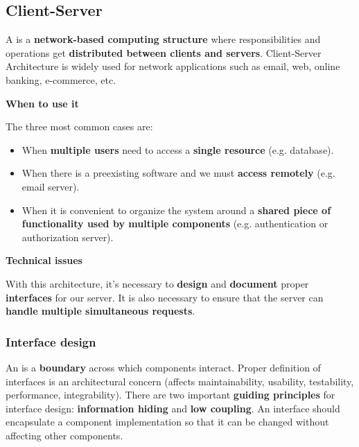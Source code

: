 \subsection{Client-Server}

A  is a \textbf{network-based computing structure} where responsibilities and operations get \textbf{distributed between clients and servers}. Client-Server Architecture is widely used for network applications such as email, web, online banking, e-commerce, etc.

\begin{flushleft}
    \textcolor{Green3}{\textbf{ When to use it}}
\end{flushleft}
The three most common cases are:
\begin{itemize}
    \item When \textbf{multiple users} need to access a \textbf{single resource} (e.g. database).

    \item When there is a preexisting software and we must \textbf{access remotely} (e.g. email server).
    
    \item When it is convenient to organize the system around a \textbf{shared piece of functionality used by multiple components} (e.g. authentication or authorization server).
\end{itemize}

\begin{flushleft}
    \textcolor{Red2}{\textbf{ Technical issues}}
\end{flushleft}
With this architecture, it's necessary to \textbf{design} and \textbf{document} proper \textbf{interfaces} for our server. It is also necessary to ensure that the server can \textbf{handle multiple simultaneous requests}.

\subsubsection{Interface design}

An  is a \textbf{boundary} across which components interact. Proper definition of interfaces is an architectural concern (affects maintainability, usability, testability, performance, integrability). There are two important \textbf{guiding principles} for interface design: \textbf{information hiding} and \textbf{low coupling}. An interface should encapsulate a component implementation so that it can be changed without affecting other components.

